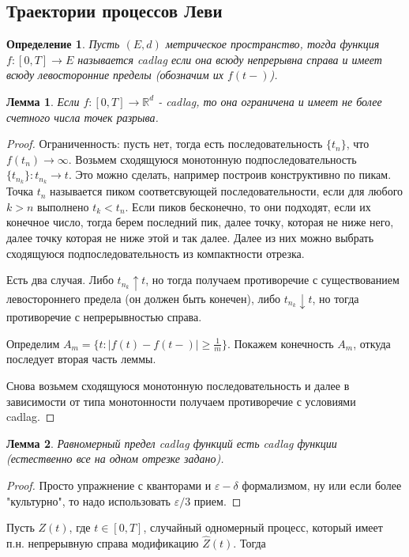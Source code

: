 \documentclass[12pt,a4paper]{article} %
\newtheorem{lemma}{Лемма}
\newtheorem{definition}{Определение}
\newcommand{\R}{\mathbb{R}}
\begin{document}
	\subsection{Траектории процессов Леви}
	\begin{definition}
		Пусть $(E,d)$ метрическое пространство, тогда функция $f:[0,T]\rightarrow E$ называется cadlag если она всюду непрерывна справа и имеет всюду левосторонние пределы (обозначим их $f(t-)$).
	\end{definition}
	\begin{lemma}
		Если $f:[0,T]\rightarrow \R^d$ - cadlag, то она ограничена и имеет не более счетного числа точек разрыва.
	\end{lemma}
	\begin{proof}
		Ограниченность: пусть нет, тогда есть последовательность $\{t_n\}$, что $f(t_n)\rightarrow\infty$. Возьмем сходящуюся монотонную подпоследовательность $\{t_{n_k}\}:t_{n_k}\rightarrow t$. Это можно сделать, например построив конструктивно по пикам. Точка $t_n$ называется пиком соответсвующей последовательности, если для любого $k>n$ выполнено $t_k<t_n$. Если пиков бесконечно, то они подходят, если их конечное число, тогда берем последний пик, далее точку, которая не ниже него, далее точку которая не ниже этой и так далее. Далее из них можно выбрать сходящуюся подпоследовательность из компактности отрезка.
		
		Есть два случая. Либо $t_{n_k}\uparrow t$, но тогда получаем противоречие с существованием левостороннего предела (он должен быть конечен), либо $t_{n_k}\downarrow t$, но тогда противоречие с непрерывностью справа.
		
		Определим $A_m=\{t:|f(t)-f(t-)|\geq\frac{1}{m}\}$. Покажем конечность $A_m$, откуда последует вторая часть леммы.
		
		Снова возьмем сходящуюся монотонную последовательность и далее в зависимости от типа монотонности получаем противоречие с условиями cadlag.
	\end{proof}
	\begin{lemma}
		Равномерный предел cadlag функций есть cadlag функции (естественно все на одном отрезке задано).
	\end{lemma}
	\begin{proof}
		Просто упражнение с кванторами и $\varepsilon-\delta$ формализмом, ну или если более "культурно", то надо использовать $\varepsilon/3$ прием.
	\end{proof}
	Пусть $Z(t)$, где $t\in[0,T]$, случайный одномерный процесс, который имеет п.н. непрерывную справа модификацию $\widehat{Z}(t)$. Тогда %
\end{document}
